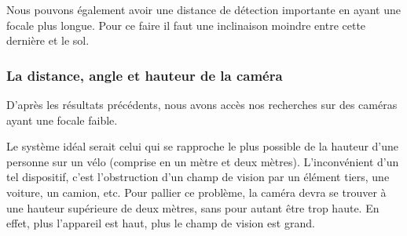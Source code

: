 Nous pouvons également avoir une distance de détection importante en ayant une focale plus longue. Pour ce faire il faut une inclinaison moindre entre cette dernière et le sol.


\subsubsection{La distance, angle et hauteur de la caméra}
\label{sec:camera_distance}
D'après les résultats précédents, nous avons accès nos recherches sur des caméras ayant une focale faible.

Le système idéal serait celui qui se rapproche le plus possible de la hauteur d'une personne sur un vélo (comprise en un mètre et deux mètres).
L'inconvénient d'un tel dispositif, c'est l'obstruction d'un champ de vision par un élément tiers, une voiture, un camion, etc. Pour pallier ce problème,
la caméra devra se trouver à une hauteur supérieure de deux mètres, sans pour autant être trop haute. En effet, plus l'appareil est haut, plus le champ de vision est grand.

